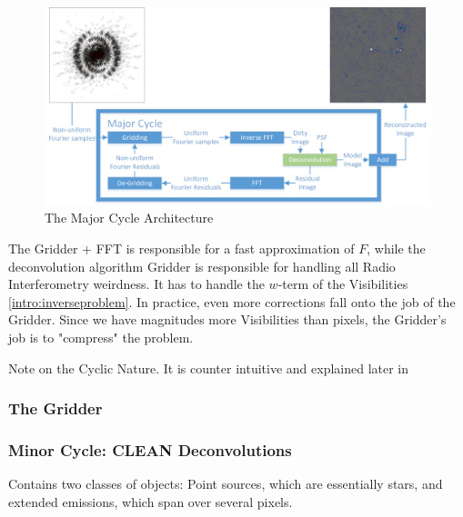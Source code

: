 \begin{figure}[h]
	\centering
	\includegraphics[width=0.80\linewidth]{./chapters/02.hypo/Major-Minor3.png}
	\caption{The Major Cycle Architecture}
	\label{intro:major}
\end{figure}

The Gridder + FFT is responsible for a fast approximation of $F$, while the deconvolution algorithm
Gridder is responsible for handling all Radio Interferometry weirdness. It has to handle the $w$-term of the Visibilities \eqref{intro:inverseproblem}. In practice, even more corrections fall onto the job of the Gridder. Since we have magnitudes more Visibilities than pixels, the Gridder's job is to "compress" the problem.

Note on the Cyclic Nature. It is counter intuitive and explained later in 

\subsubsection{The Gridder}


\subsubsection{Minor Cycle: CLEAN Deconvolutions}
Contains two classes of objects: Point sources, which are essentially stars, and extended emissions, which span over several pixels.


